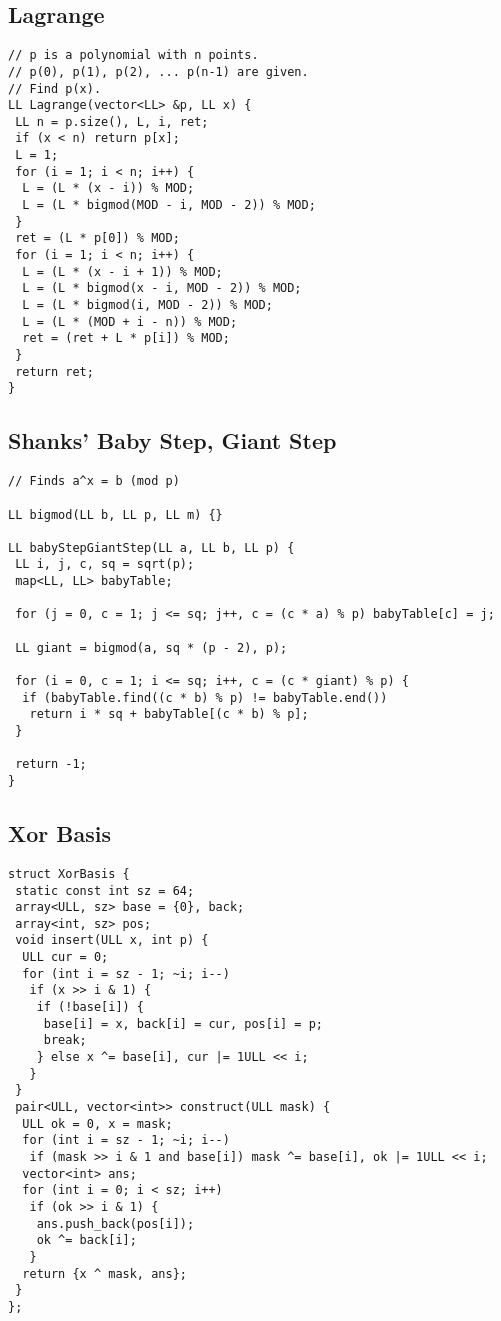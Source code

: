\documentclass[a4paper,11pt,oneside]{article}
\begin{document}
\begin{multicols*}{\COLS}
\begin{lstlisting}
\end{lstlisting}
\subsection{Lagrange}
\begin{lstlisting}
// p is a polynomial with n points.
// p(0), p(1), p(2), ... p(n-1) are given.
// Find p(x).
LL Lagrange(vector<LL> &p, LL x) {
 LL n = p.size(), L, i, ret;
 if (x < n) return p[x];
 L = 1;
 for (i = 1; i < n; i++) {
  L = (L * (x - i)) % MOD;
  L = (L * bigmod(MOD - i, MOD - 2)) % MOD;
 }
 ret = (L * p[0]) % MOD;
 for (i = 1; i < n; i++) {
  L = (L * (x - i + 1)) % MOD;
  L = (L * bigmod(x - i, MOD - 2)) % MOD;
  L = (L * bigmod(i, MOD - 2)) % MOD;
  L = (L * (MOD + i - n)) % MOD;
  ret = (ret + L * p[i]) % MOD;
 }
 return ret;
}
\end{lstlisting}
\subsection{Shanks' Baby Step, Giant Step}
\begin{lstlisting}
// Finds a^x = b (mod p)

LL bigmod(LL b, LL p, LL m) {}

LL babyStepGiantStep(LL a, LL b, LL p) {
 LL i, j, c, sq = sqrt(p);
 map<LL, LL> babyTable;

 for (j = 0, c = 1; j <= sq; j++, c = (c * a) % p) babyTable[c] = j;

 LL giant = bigmod(a, sq * (p - 2), p);

 for (i = 0, c = 1; i <= sq; i++, c = (c * giant) % p) {
  if (babyTable.find((c * b) % p) != babyTable.end())
   return i * sq + babyTable[(c * b) % p];
 }

 return -1;
}
\end{lstlisting}
\subsection{Xor Basis}
\begin{lstlisting}
struct XorBasis {
 static const int sz = 64;
 array<ULL, sz> base = {0}, back;
 array<int, sz> pos;
 void insert(ULL x, int p) {
  ULL cur = 0;
  for (int i = sz - 1; ~i; i--)
   if (x >> i & 1) {
    if (!base[i]) {
     base[i] = x, back[i] = cur, pos[i] = p;
     break;
    } else x ^= base[i], cur |= 1ULL << i;
   }
 }
 pair<ULL, vector<int>> construct(ULL mask) {
  ULL ok = 0, x = mask;
  for (int i = sz - 1; ~i; i--)
   if (mask >> i & 1 and base[i]) mask ^= base[i], ok |= 1ULL << i;
  vector<int> ans;
  for (int i = 0; i < sz; i++)
   if (ok >> i & 1) {
    ans.push_back(pos[i]);
    ok ^= back[i];
   }
  return {x ^ mask, ans};
 }
};
\end{lstlisting}

\end{multicols*}
\end{document}
